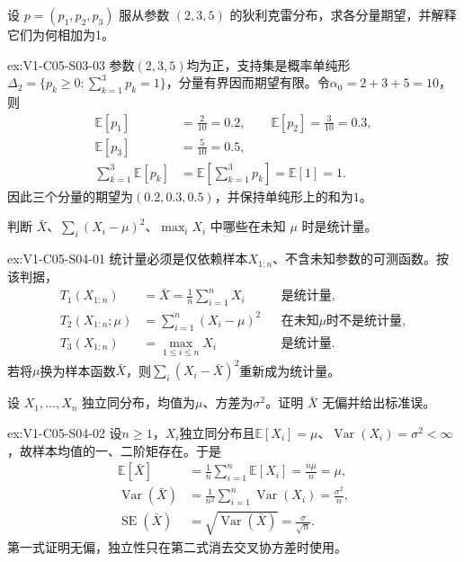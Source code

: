 \begin{SLChapterExercisePairSection}
\begin{exercise}\label{ex:V1-C05-S03-03}
设 $p=(p_1,p_2,p_3)$ 服从参数 $(2,3,5)$ 的狄利克雷分布，求各分量期望，并解释它们为何相加为1。
\end{exercise}
\label{sol:V1-C05-S03-03}
\begin{chapterexercisesolution}{ex:V1-C05-S03-03}
参数$(2,3,5)$均为正，支持集是概率单纯形
$\Delta_2=\{p_k\ge0:\sum_{k=1}^3p_k=1\}$，分量有界因而期望有限。令$\alpha_0=2+3+5=10$，则
\[
\begin{aligned}
\mathbb E[p_1]&=\frac2{10}=0.2,\qquad
\mathbb E[p_2]=\frac3{10}=0.3,\\
\mathbb E[p_3]&=\frac5{10}=0.5,\\
\sum_{k=1}^3\mathbb E[p_k]
&=\mathbb E\!\left[\sum_{k=1}^3p_k\right]
=\mathbb E[1]=1.
\end{aligned}
\]
因此三个分量的期望为$(0.2,0.3,0.5)$，并保持单纯形上的和为$1$。
\end{chapterexercisesolution}

\begin{exercise}\label{ex:V1-C05-S04-01}
判断 $\bar X$、$\sum_i(X_i-\mu)^2$、$\max_iX_i$ 中哪些在未知 $\mu$ 时是统计量。
\end{exercise}
\label{sol:V1-C05-S04-01}
\begin{chapterexercisesolution}{ex:V1-C05-S04-01}
统计量必须是仅依赖样本$X_{1:n}$、不含未知参数的可测函数。按该判据，
\[
\begin{aligned}
T_1(X_{1:n})&=\bar X=\frac1n\sum_{i=1}^nX_i
&&\text{是统计量},\\
T_2(X_{1:n};\mu)&=\sum_{i=1}^n(X_i-\mu)^2
&&\text{在未知$\mu$时不是统计量},\\
T_3(X_{1:n})&=\max_{1\le i\le n}X_i
&&\text{是统计量}.
\end{aligned}
\]
若将$\mu$换为样本函数$\bar X$，则$\sum_i(X_i-\bar X)^2$重新成为统计量。
\end{chapterexercisesolution}

\begin{exercise}\label{ex:V1-C05-S04-02}
设 $X_1,\ldots,X_n$ 独立同分布，均值为$\mu$、方差为$\sigma^2$。证明 $\bar X$ 无偏并给出标准误。
\end{exercise}
\label{sol:V1-C05-S04-02}
\begin{chapterexercisesolution}{ex:V1-C05-S04-02}
设$n\ge1$，$X_i$独立同分布且$\mathbb E[X_i]=\mu$、$\operatorname{Var}(X_i)=\sigma^2<\infty$，故样本均值的一、二阶矩存在。于是
\[
\begin{aligned}
\mathbb E[\bar X]
&=\frac1n\sum_{i=1}^n\mathbb E[X_i]
=\frac{n\mu}{n}=\mu,\\
\operatorname{Var}(\bar X)
&=\frac1{n^2}\sum_{i=1}^n\operatorname{Var}(X_i)
=\frac{\sigma^2}{n},\\
\operatorname{SE}(\bar X)
&=\sqrt{\operatorname{Var}(\bar X)}
=\frac{\sigma}{\sqrt n}.
\end{aligned}
\]
第一式证明无偏，独立性只在第二式消去交叉协方差时使用。
\end{chapterexercisesolution}


\end{SLChapterExercisePairSection}
